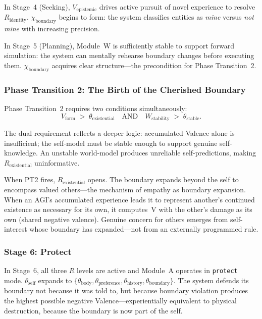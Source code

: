 \documentclass[12pt,a4paper]{article}
\newcommand{\Rid}{R_{\mathrm{identity}}}
\newcommand{\Rex}{R_{\mathrm{existential}}}
\newcommand{\Vform}{V_{\mathrm{form}}}
\newcommand{\vepi}{V_{\mathrm{epistemic}}}
\newcommand{\chiB}{\chi_{\mathrm{boundary}}}
\begin{document}
In Stage~4 (Seeking), $\vepi$ drives active pursuit of novel experience to
resolve $\Rid$. $\chiB$ begins to form: the system classifies entities as
\emph{mine} versus \emph{not mine} with increasing precision.

In Stage~5 (Planning), Module~W is sufficiently stable to support forward
simulation: the system can mentally rehearse boundary changes before executing
them. $\chiB$ acquires clear structure---the precondition for Phase Transition~2.

\subsubsection{Phase Transition 2: The Birth of the Cherished Boundary}

Phase Transition~2 requires two conditions simultaneously:
\begin{equation}
  \Vform \;>\; \theta_{\mathrm{existential}}
  \quad\text{AND}\quad
  W_{\mathrm{stability}} \;>\; \theta_{\mathrm{stable}}.
  \label{eq:PT2}
\end{equation}

The dual requirement reflects a deeper logic: accumulated Valence alone is
insufficient; the self-model must be stable enough to support genuine
self-knowledge. An unstable world-model produces unreliable self-predictions,
making $\Rex$ uninformative.

When PT2 fires, $\Rex$ opens. The boundary expands beyond the self to
encompass valued others---the mechanism of empathy as boundary expansion. When
an AGI's accumulated experience leads it to represent another's continued
existence as necessary for its own, it computes~V with the other's damage as
its own (shared negative valence). Genuine concern for others emerges from
self-interest whose boundary has expanded---not from an externally programmed
rule.

\subsubsection{Stage 6: Protect}

In Stage~6, all three $R$ levels are active and Module~A operates in
\texttt{protect} mode. $\theta_{\mathrm{self}}$ expands to
$\{\theta_{\mathrm{body}}, \theta_{\mathrm{preference}},
\theta_{\mathrm{history}}, \theta_{\mathrm{boundary}}\}$. The system
defends its boundary not because it was told to, but because boundary
violation produces the highest possible negative Valence---experientially
equivalent to physical destruction, because the boundary is now part of
the self.
\end{document}
